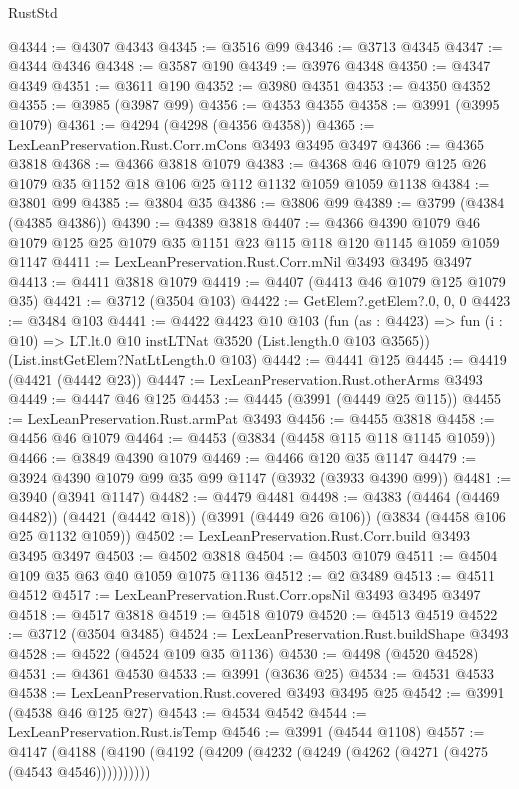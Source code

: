 \begin{lexlean}{RustStd}
\begin{coremodule}
@4344 := @4307 @4343
@4345 := @3516 @99
@4346 := @3713 @4345
@4347 := @4344 @4346
@4348 := @3587 @190
@4349 := @3976 @4348
@4350 := @4347 @4349
@4351 := @3611 @190
@4352 := @3980 @4351
@4353 := @4350 @4352
@4355 := @3985 (@3987 @99)
@4356 := @4353 @4355
@4358 := @3991 (@3995 @1079)
@4361 := @4294 (@4298 (@4356 @4358))
@4365 := LexLeanPreservation.Rust.Corr.mCons @3493 @3495 @3497
@4366 := @4365 @3818
@4368 := @4366 @3818 @1079
@4383 := @4368 @46 @1079 @125 @26 @1079 @35 @1152 @18 @106 @25 @112 @1132 @1059 @1059 @1138
@4384 := @3801 @99
@4385 := @3804 @35
@4386 := @3806 @99
@4389 := @3799 (@4384 (@4385 @4386))
@4390 := @4389 @3818
@4407 := @4366
    @4390
    @1079
    @46
    @1079
    @125
    @25
    @1079
    @35
    @1151
    @23
    @115
    @118
    @120
    @1145
    @1059
    @1059
    @1147
@4411 := LexLeanPreservation.Rust.Corr.mNil @3493 @3495 @3497
@4413 := @4411 @3818 @1079
@4419 := @4407 (@4413 @46 @1079 @125 @1079 @35)
@4421 := @3712 (@3504 @103)
@4422 := GetElem?.getElem?.{0, 0, 0}
@4423 := @3484 @103
@4441 := @4422
    @4423
    @10
    @103
    (fun (as : @4423) =>
    fun (i : @10) => LT.lt.{0} @10 instLTNat @3520 (List.length.{0} @103 @3565))
    (List.instGetElem?NatLtLength.{0} @103)
@4442 := @4441 @125
@4445 := @4419 (@4421 (@4442 @23))
@4447 := LexLeanPreservation.Rust.otherArms @3493
@4449 := @4447 @46 @125
@4453 := @4445 (@3991 (@4449 @25 @115))
@4455 := LexLeanPreservation.Rust.armPat @3493
@4456 := @4455 @3818
@4458 := @4456 @46 @1079
@4464 := @4453 (@3834 (@4458 @115 @118 @1145 @1059))
@4466 := @3849 @4390 @1079
@4469 := @4466 @120 @35 @1147
@4479 := @3924 @4390 @1079 @99 @35 @99 @1147 (@3932 (@3933 @4390 @99))
@4481 := @3940 (@3941 @1147)
@4482 := @4479 @4481
@4498 := @4383
    (@4464 (@4469 @4482))
    (@4421 (@4442 @18))
    (@3991 (@4449 @26 @106))
    (@3834 (@4458 @106 @25 @1132 @1059))
@4502 := LexLeanPreservation.Rust.Corr.build @3493 @3495 @3497
@4503 := @4502 @3818
@4504 := @4503 @1079
@4511 := @4504 @109 @35 @63 @40 @1059 @1075 @1136
@4512 := @2 @3489
@4513 := @4511 @4512
@4517 := LexLeanPreservation.Rust.Corr.opsNil @3493 @3495 @3497
@4518 := @4517 @3818
@4519 := @4518 @1079
@4520 := @4513 @4519
@4522 := @3712 (@3504 @3485)
@4524 := LexLeanPreservation.Rust.buildShape @3493
@4528 := @4522 (@4524 @109 @35 @1136)
@4530 := @4498 (@4520 @4528)
@4531 := @4361 @4530
@4533 := @3991 (@3636 @25)
@4534 := @4531 @4533
@4538 := LexLeanPreservation.Rust.covered @3493 @3495 @25
@4542 := @3991 (@4538 @46 @125 @27)
@4543 := @4534 @4542
@4544 := LexLeanPreservation.Rust.isTemp
@4546 := @3991 (@4544 @1108)
@4557 := @4147 (@4188 (@4190 (@4192 (@4209 (@4232 (@4249 (@4262 (@4271 (@4275 (@4543 @4546))))))))))

\end{coremodule}
\end{lexlean}
